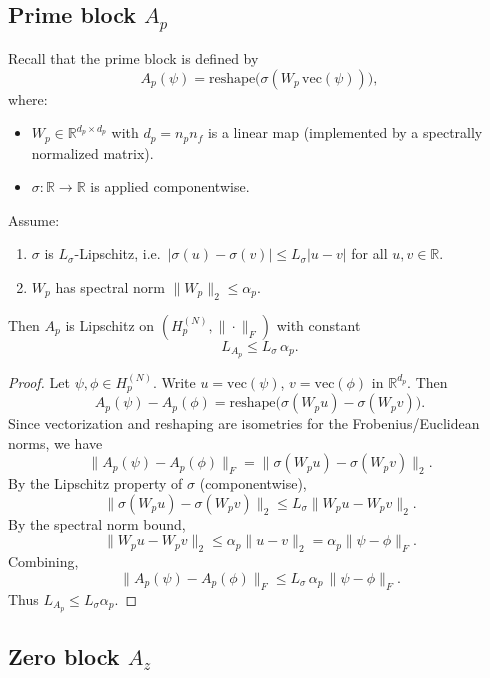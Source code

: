 \documentclass[11pt]{article}
\theoremstyle{definition}
\theoremstyle{plain}
\begin{document}
\subsection{Prime block \texorpdfstring{$A_p$}{Ap}}

Recall that the prime block is defined by
\[
  A_p(\psi)
  = \mathrm{reshape}\bigl(\sigma(W_p\,\mathrm{vec}(\psi))\bigr),
\]
where:
\begin{itemize}[leftmargin=*]
  \item $W_p \in \mathbb{R}^{d_p \times d_p}$ with $d_p = n_p n_f$ is a linear map (implemented by a spectrally normalized matrix).
  \item $\sigma:\mathbb{R}\to\mathbb{R}$ is applied componentwise.
\end{itemize}

\begin{lemma}\label{lem:L_Ap}
Assume:
\begin{enumerate}[label=(\roman*), leftmargin=*]
  \item $\sigma$ is $L_\sigma$-Lipschitz, i.e.\ $|\sigma(u)-\sigma(v)| \le L_\sigma |u-v|$ for all $u,v\in\mathbb{R}$.
  \item $W_p$ has spectral norm $\|W_p\|_2\le\alpha_p$.
\end{enumerate}
Then $A_p$ is Lipschitz on $(H_p^{(N)},\|\cdot\|_F)$ with constant
\[
  L_{A_p} \le L_\sigma\,\alpha_p.
\]
\end{lemma}

\begin{proof}
Let $\psi,\phi \in H_p^{(N)}$. Write $u = \mathrm{vec}(\psi)$, $v = \mathrm{vec}(\phi)$ in $\mathbb{R}^{d_p}$.
Then
\[
  A_p(\psi) - A_p(\phi)
  = \mathrm{reshape}\bigl(\sigma(W_p u) - \sigma(W_p v)\bigr).
\]
Since vectorization and reshaping are isometries for the Frobenius/Euclidean norms, we have
\[
  \|A_p(\psi) - A_p(\phi)\|_F
  = \|\sigma(W_p u) - \sigma(W_p v)\|_2.
\]
By the Lipschitz property of $\sigma$ (componentwise),
\[
  \|\sigma(W_p u) - \sigma(W_p v)\|_2
  \le L_\sigma \|W_p u - W_p v\|_2.
\]
By the spectral norm bound,
\[
  \|W_p u - W_p v\|_2
  \le \alpha_p \|u - v\|_2
  = \alpha_p \|\psi - \phi\|_F.
\]
Combining,
\[
  \|A_p(\psi) - A_p(\phi)\|_F
  \le L_\sigma\,\alpha_p\,\|\psi - \phi\|_F.
\]
Thus $L_{A_p} \le L_\sigma \alpha_p$.
\end{proof}

\subsection{Zero block \texorpdfstring{$A_z$}{Az}}
\end{document}
